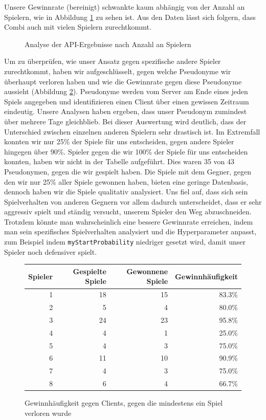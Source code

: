 \documentclass[12pt,a4paper]{article}
\begin{document}
Unsere Gewinnrate (bereinigt) schwankte kaum abhängig von der Anzahl an Spielern, wie in Abbildung \ref{fig:api-num-players} zu sehen ist. Aus den Daten lässt sich folgern, dass Combi auch mit vielen Spielern zurechtkommt.

\begin{figure}[h]
    \centering
    
    \caption{Analyse der API-Ergebnisse nach Anzahl an Spielern}
    \label{fig:api-num-players}
\end{figure}

Um zu überprüfen, wie unser Ansatz gegen spezifische andere Spieler zurechtkommt, haben wir aufgeschlüsselt, gegen welche Pseudonyme wir überhaupt verloren haben und wie die Gewinnrate gegen diese Pseudonyme aussieht (Abbildung \ref{fig:pseudonyme}). Pseudonyme werden vom Server am Ende eines jeden Spiels angegeben und identifizieren einen Client über einen gewissen Zeitraum eindeutig. Unsere Analysen haben ergeben, dass unser Pseudonym zumindest über mehrere Tage gleichblieb. Bei dieser Auswertung wird deutlich, dass der Unterschied zwischen einzelnen anderen Spielern sehr drastisch ist. Im Extremfall konnten wir nur 25\% der Spiele für uns entscheiden, gegen andere Spieler hingegen über 90\%. Spieler gegen die wir 100\% der Spiele für uns entscheiden konnten, haben wir nicht in der Tabelle aufgeführt. Dies waren 35 von 43 Pseudonymen, gegen die wir gespielt haben. Die Spiele mit dem Gegner, gegen den wir nur 25\% aller Spiele gewonnen haben, bieten eine geringe Datenbasis, dennoch haben wir die Spiele qualitativ analysiert. Uns fiel auf, dass sich sein Spielverhalten von anderen Gegnern vor allem dadurch unterscheidet, dass er sehr aggressiv spielt und ständig versucht, unserem Spieler den Weg abzuschneiden. Trotzdem könnte man wahrscheinlich eine bessere Gewinnrate erreichen, indem man sein spezifisches Spielverhalten analysiert und die Hyperparameter anpasst, zum Beispiel indem \texttt{myStartProbability} niedriger gesetzt wird, damit unser Spieler noch defensiver spielt.

\begin{figure}[h]
    \centering
    \begin{tabular}{r|r|r|r}
        Spieler & Gespielte Spiele & Gewonnene Spiele & Gewinnhäufigkeit \\ \hline \hline
        1 & 18 & 15 & 83.3\% \\ \hline
        2 & 5 & 4 & 80.0\% \\ \hline
        3 & 24 & 23 &  95.8\% \\ \hline
        4 & 4 & 1 & 25.0\% \\ \hline
        5 & 4 & 3 & 75.0\% \\ \hline
        6 & 11 & 10 & 90.9\% \\ \hline
        7 & 4 & 3 & 75.0\% \\ \hline
        8 & 6 & 4 & 66.7\% \\
    \end{tabular}
    \caption{Gewinnhäufigkeit gegen Clients, gegen die mindestens ein Spiel verloren wurde}
    \label{fig:pseudonyme}
\end{figure}
\end{document}
